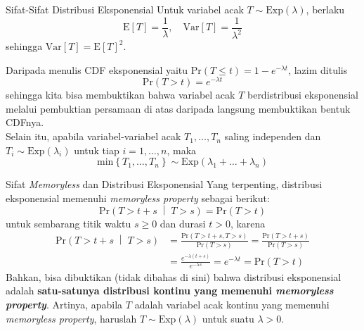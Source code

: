 \documentclass{beamer}
\newcommand{\pars}[1]{\left(#1\right)}
\newcommand{\brackets}[1]{\left[#1\right]}
\newcommand{\braces}[1]{\left\{#1\right\}}
\begin{document}
\begin{frame}{Sifat-Sifat Distribusi Eksponensial}
    Untuk variabel acak \(T \sim \text{Exp}(\lambda)\), berlaku
    \[\text{E}\brackets{T} = \frac{1}{\lambda}, \quad \text{Var}\brackets{T} = \frac{1}{\lambda^2}\]
    sehingga \(\text{Var}\brackets{T} = \text{E}\brackets{T}^2\).

    Daripada menulis CDF eksponensial yaitu \(\text{Pr}(T \le t) = 1 - e^{-\lambda t}\), lazim ditulis
    \[\text{Pr}(T > t) = e^{-\lambda t}\]
    sehingga kita bisa membuktikan bahwa variabel acak \(T\) berdistribusi eksponensial melalui pembuktian persamaan di atas daripada langsung membuktikan bentuk CDFnya. \\[0.25em]

    Selain itu, apabila variabel-variabel acak \(T_1, \dots, T_n\) saling independen dan \(T_i \sim \text{Exp}(\lambda_i)\) untuk tiap \(i=1,\dots,n\), maka
    \[\text{min}\braces{T_1, \dots, T_n} \sim \text{Exp}\pars{\lambda_1 + \dots + \lambda_n}\]
\end{frame}

\begin{frame}{Sifat \textit{Memoryless} dan Distribusi Eksponensial}
    Yang terpenting, distribusi eksponensial memenuhi \textit{memoryless property} sebagai berikut:
    \[\text{Pr}\pars{T > t+s \; \middle| \; T > s} = \text{Pr}\pars{T > t}\]
    untuk sembarang titik waktu \(s \ge 0\) dan durasi \(t > 0\), karena
    \begin{align*}
        \text{Pr}\pars{T > t+s \; \middle| \; T > s} &= \frac{\text{Pr}\pars{T>t+s, T>s}}{\text{Pr}\pars{T>s}} = \frac{\text{Pr}\pars{T>t+s}}{\text{Pr}\pars{T>s}} \\
        &= \frac{e^{-\lambda \pars{t+s}}}{e^{-\lambda s}} = e^{-\lambda t} = \text{Pr}\pars{T > t}
    \end{align*}
    Bahkan, bisa dibuktikan (tidak dibahas di sini) bahwa distribusi eksponensial adalah \textbf{satu-satunya distribusi kontinu yang memenuhi \textit{memoryless property}}. Artinya, apabila \(T\) adalah variabel acak kontinu yang memenuhi \textit{memoryless property}, haruslah \(T \sim \text{Exp}(\lambda)\) untuk suatu \(\lambda > 0\).
\end{frame}
\end{document}
